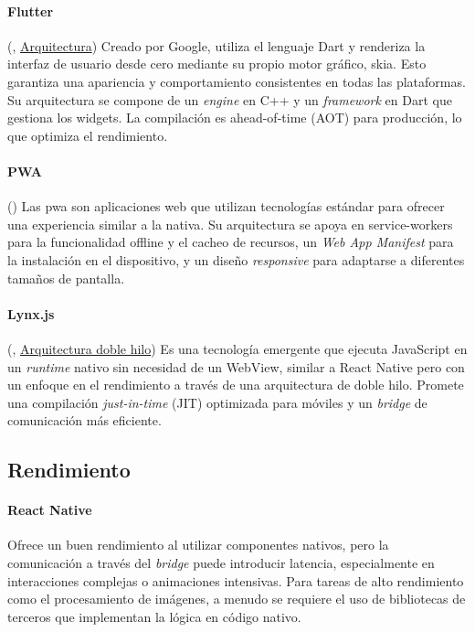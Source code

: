 \paragraph{Flutter}
(\cite{flutter-documentation}, \href{https://docs.flutter.dev/resources/architectural-overview}{Arquitectura}) Creado por Google, utiliza el lenguaje Dart y renderiza la interfaz de usuario desde cero mediante su propio motor gráfico, \gls{skia}. Esto garantiza una apariencia y comportamiento consistentes en todas las plataformas. Su arquitectura se compone de un \textit{engine} en C++ y un \textit{framework} en Dart que gestiona los widgets. La compilación es \gls{ahead-of-time} (AOT) para producción, lo que optimiza el rendimiento.

\paragraph{PWA}
(\cite{pwa-documentation}) Las \acrfull{pwa} son aplicaciones web que utilizan tecnologías estándar para ofrecer una experiencia similar a la nativa. Su arquitectura se apoya en \glspl{service-worker} para la funcionalidad offline y el cacheo de recursos, un \textit{Web App Manifest} para la instalación en el dispositivo, y un diseño \textit{responsive} para adaptarse a diferentes tamaños de pantalla.

\paragraph{Lynx.js}
(\cite{lynx-documentation}, \href{https://lynxjs.org/react/lifecycle.html#dual-thread-architecture-design}{Arquitectura doble hilo}) Es una tecnología emergente que ejecuta JavaScript en un \textit{runtime} nativo sin necesidad de un WebView, similar a React Native pero con un enfoque en el rendimiento a través de una arquitectura de doble hilo. Promete una compilación \textit{just-in-time} (JIT) optimizada para móviles y un \textit{bridge} de comunicación más eficiente.

\subsection{Rendimiento}

\paragraph{React Native}
Ofrece un buen rendimiento al utilizar componentes nativos, pero la comunicación a través del \textit{bridge} puede introducir latencia, especialmente en interacciones complejas o animaciones intensivas. Para tareas de alto rendimiento como el procesamiento de imágenes, a menudo se requiere el uso de bibliotecas de terceros que implementan la lógica en código nativo.

